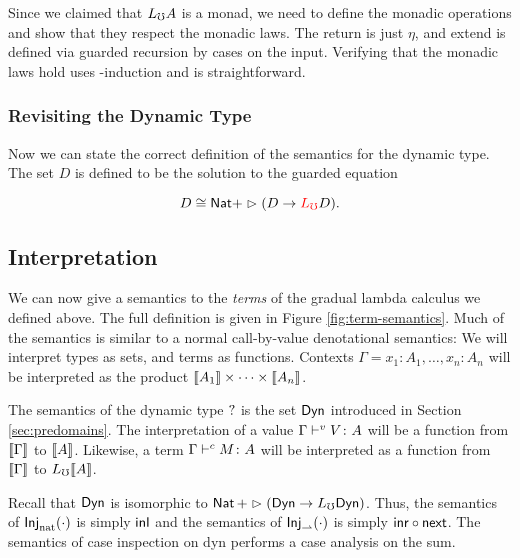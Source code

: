 Since we claimed that $L_\mho A$ is a monad, we need to define the monadic operations
and show that they respect the monadic laws. The return is just $\eta$, and extend
is defined via guarded recursion by cases on the input.
%
%
Verifying that the monadic laws hold uses \lob-induction and is straightforward.


\subsubsection{Revisiting the Dynamic Type}
Now we can state the correct definition of the semantics for the dynamic type.
The set $D$ is defined to be the solution to the guarded equation

\[ D \cong \mathsf{Nat} + \vartriangleright (D \to \textcolor{red}{L_\mho} D). \]


\subsection{Interpretation}\label{sec:term-interpretation}

We can now give a semantics to the \emph{terms} of the gradual lambda calculus we defined
above. The full definition is given in Figure \ref{fig:term-semantics}.
%
Much of the semantics is similar to a normal call-by-value denotational semantics:
We will interpret types as sets, and terms as functions.
Contexts $\Gamma = x_1 \colon A_1, \dots, x_n \colon A_n$
will be interpreted as the product $\llbracket {A_1} \rrbracket \times \cdots \times \llbracket {A_n} \rrbracket$.


The semantics of the dynamic type $?$ is the set $\mathsf{Dyn}$ introduced in Section
\ref{sec:predomains}.
%
The interpretation of a value ${\Gamma} \vdash^v {V} \colon {A}$ will be a function from
$\llbracket {\Gamma} \rrbracket$ to $\llbracket {A} \rrbracket$. Likewise, a term ${\Gamma} \vdash^c {M} \colon {{A}}$ will be interpreted
as a function from $\llbracket {\Gamma} \rrbracket$ to $L_\mho \llbracket {A} \rrbracket$.

Recall that $\mathsf{Dyn}$ is isomorphic to $\mathsf{Nat}\, + \vartriangleright (\mathsf{Dyn} \to L_\mho \mathsf{Dyn})$.
Thus, the semantics of $\textsf{Inj}_\text{nat} ({\cdot})$ is simply $\mathsf{inl}$ and the semantics
of $\textsf{Inj}_\rightharpoonup ({\cdot})$ is simply $\mathsf{inr} \circ \mathsf{next}$.
The semantics of case inspection on dyn performs a case analysis on the sum.

